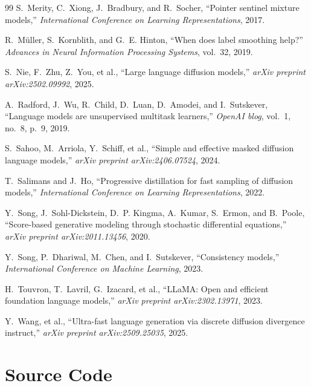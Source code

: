 \documentclass[conference]{IEEEtran}
\begin{document}
\begin{thebibliography}{99}
S.~Merity, C.~Xiong, J.~Bradbury, and R.~Socher,
``Pointer sentinel mixture models,''
\emph{International Conference on Learning Representations}, 2017.

R.~M{\"u}ller, S.~Kornblith, and G.~E. Hinton,
``When does label smoothing help?''
\emph{Advances in Neural Information Processing Systems}, vol.~32, 2019.

S.~Nie, F.~Zhu, Z.~You, et al.,
``Large language diffusion models,''
\emph{arXiv preprint arXiv:2502.09992}, 2025.

A.~Radford, J.~Wu, R.~Child, D.~Luan, D.~Amodei, and I.~Sutskever,
``Language models are unsupervised multitask learners,''
\emph{OpenAI blog}, vol.~1, no.~8, p.~9, 2019.

S.~Sahoo, M.~Arriola, Y.~Schiff, et al.,
``Simple and effective masked diffusion language models,''
\emph{arXiv preprint arXiv:2406.07524}, 2024.

T.~Salimans and J.~Ho,
``Progressive distillation for fast sampling of diffusion models,''
\emph{International Conference on Learning Representations}, 2022.

Y.~Song, J.~Sohl-Dickstein, D.~P. Kingma, A.~Kumar, S.~Ermon, and B.~Poole,
``Score-based generative modeling through stochastic differential equations,''
\emph{arXiv preprint arXiv:2011.13456}, 2020.

Y.~Song, P.~Dhariwal, M.~Chen, and I.~Sutskever,
``Consistency models,''
\emph{International Conference on Machine Learning}, 2023.

H.~Touvron, T.~Lavril, G.~Izacard, et al.,
``LLaMA: Open and efficient foundation language models,''
\emph{arXiv preprint arXiv:2302.13971}, 2023.

Y.~Wang, et al.,
``Ultra-fast language generation via discrete diffusion divergence instruct,''
\emph{arXiv preprint arXiv:2509.25035}, 2025.

\end{thebibliography}

\section{Source Code}
\label{appendix:code}
\end{document}
